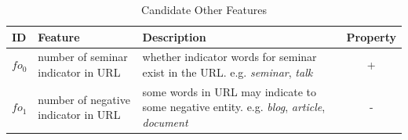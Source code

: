 \begin{table}[htb!]
\small
\centering
\caption{Candidate Other Features}
\label{tab:ca_feature:other}
\begin{tabular}{@{}p{}p{}p{}c@{}}
\toprule
\textbf{ID} & \textbf{Feature} & \textbf{Description} & \textbf{Property} \\ \midrule
$fo_{0}$ 
	& number of seminar indicator in URL 
	& whether indicator words for seminar exist in the URL. e.g. \textit{seminar}, \textit{talk}
	& + \\ \midrule
$fo_{1}$ 
	& number of negative indicator in URL 
	& some words in URL may indicate to some negative entity. e.g. \textit{blog}, \textit{article}, \textit{document}
	& - \\ \bottomrule
\end{tabular}
\end{table}

